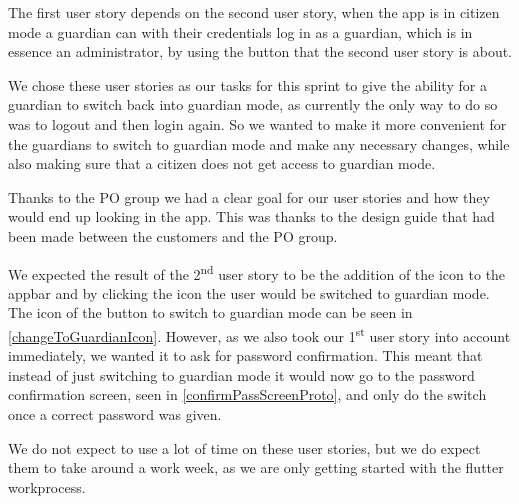 The first user story depends on the second user story, when the app is in citizen mode a guardian can with their credentials log in as a guardian, which is in essence an administrator, by using the button that the second user story is about.

We chose these user stories as our tasks for this sprint to give the ability for a guardian to switch back into guardian mode, as currently the only way to do so was to logout and then login again.
So we wanted to make it more convenient for the guardians to switch to guardian mode and make any necessary changes, while also making sure that a citizen does not get access to guardian mode.

Thanks to the PO group we had a clear goal for our user stories and how they would end up looking in the app.
This was thanks to the design guide that had been made between the customers and the PO group.

We expected the result of the 2\textsuperscript{nd} user story to be the addition of the icon to the appbar and by clicking the icon the user would be switched to guardian mode.
The icon of the button to switch to guardian mode can be seen in \autoref{changeToGuardianIcon}.
However, as we also took our 1\textsuperscript{st} user story into account immediately, we wanted it to ask for password confirmation.
This meant that instead of just switching to guardian mode it would now go to the password confirmation screen, seen in \autoref{confirmPassScreenProto}, and only do the switch once a correct password was given.



We do not expect to use a lot of time on these user stories, but we do expect them to take around a work week, as we are only getting started with the flutter workprocess.
